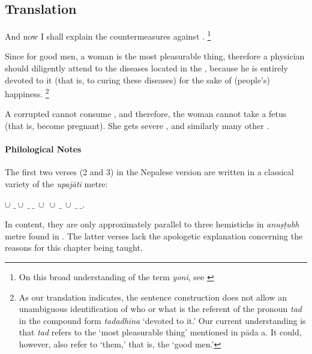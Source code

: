 \subsection*{Translation}
\begin{translation}

\item [1] And now I shall explain the countermeasures against .%
	\footnote{%
	On this broad understanding of the term \emph{yoni}, see \cite[pp.\ 
	572--5]{das-orig}}


\item [*3] Since for good men, a woman is the most pleasurable thing, therefore a physician should diligently attend to the diseases located in the , because he is entirely devoted to it (that is, to curing these diseases) for the sake of (people's) happiness.%
	\footnote{%
	As our translation indicates, the sentence construction does not allow an 
	unambiguous identification of who or what is the referent of the pronoun 
	\textit{tad} in the compound form \emph{tadadhīna} ‘devoted to it.’ Our 
	current understanding is that \emph{tad} refers to the ‘most pleasurable thing’ 
	mentioned in pāda a. It could, however, also refer to ‘them,’ that is, the ‘good 
	men.’%
	}

\item [*4] A corrupted  cannot consume , and therefore, the woman cannot take a fetus (that is, become pregnant). She gets severe 
\se{arśas}{prolapses}, 
 and similarly many other 
.
\end{translation}

\paragraph*{Philological Notes}
The first two verses (2 and 3) in the Nepalese version are written in a classical variety of the \emph{upajāti} metre: 
	\begin{center}
	 \underline{$\cup$} $\_ \cup\ \_\ \_\ \cup\ \cup\ \_\ \cup\ \_\ \_$.
	\end{center} 
In content, they are only approximately parallel to three hemistichs in \textit{anuṣṭubh} metre found in \cite{vulgate}. The latter verses lack the apologetic explanation concerning the reasons for this chapter being taught.

